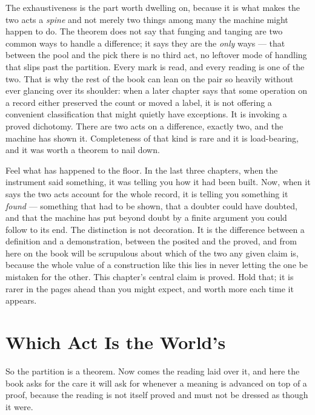 The exhaustiveness is the part worth dwelling on, because it is what makes the two acts a \emph{spine} and not
merely two things among many the machine might happen to do. The theorem does not say that funging and tanging
are two common ways to handle a difference; it says they are the \emph{only} ways --- that between the pool and
the pick there is no third act, no leftover mode of handling that slips past the partition. Every mark is read,
and every reading is one of the two. That is why the rest of the book can lean on the pair so heavily without
ever glancing over its shoulder: when a later chapter says that some operation on a record either preserved the
count or moved a label, it is not offering a convenient classification that might quietly have exceptions. It is
invoking a proved dichotomy. There are two acts on a difference, exactly two, and the machine has shown it.
Completeness of that kind is rare and it is load-bearing, and it was worth a theorem to nail down.

Feel what has happened to the floor. In the last three chapters, when the instrument said something, it was
telling you how it had been built. Now, when it says the two acts account for the whole record, it is telling you
something it \emph{found} --- something that had to be shown, that a doubter could have doubted, and that the
machine has put beyond doubt by a finite argument you could follow to its end. The distinction is not decoration.
It is the difference between a definition and a demonstration, between the posited and the proved, and from here
on the book will be scrupulous about which of the two any given claim is, because the whole value of a
construction like this lies in never letting the one be mistaken for the other. This chapter's central claim is
proved. Hold that; it is rarer in the pages ahead than you might expect, and worth more each time it appears.

\section{Which Act Is the World's}

So the partition is a theorem. Now comes the reading laid over it, and here the book asks for the care it will
ask for whenever a meaning is advanced on top of a proof, because the reading is not itself proved and must not
be dressed as though it were.

